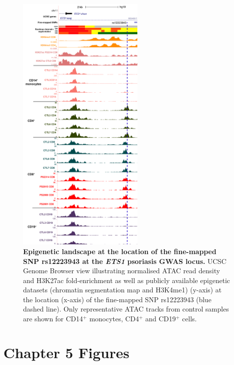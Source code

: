 \begin{figure}[htbp]
\centering
\includegraphics[width=0.55\textwidth]{./Appendix/pdfs/Chapter4/UCSC_ETS1_credible_set_track}
\caption[Epigenetic landscape at the location of the fine-mapped SNP rs12223943 at the \textit{ETS1} psoriasis GWAS locus.]{\textbf{Epigenetic landscape at the location of the fine-mapped SNP rs12223943 at the \textit{ETS1} psoriasis GWAS locus.} UCSC Genome Browser view illustrating normalised ATAC read density and H3K27ac fold-enrichment as well as publicly available epigenetic datasets (chromatin segmentation map and H3K4me1) (y-axis) at the location (x-axis) of the fine-mapped SNP rs12223943 (blue dashed line). Only representative ATAC tracks from control samples are shown for CD14$^+$ monocytes, CD4$^+$ and CD19$^+$ cells.}
\label{figure:ATAC_PS_CTL_ETS1_FM}
\end{figure}




\clearpage

\section{Chapter 5 Figures}


